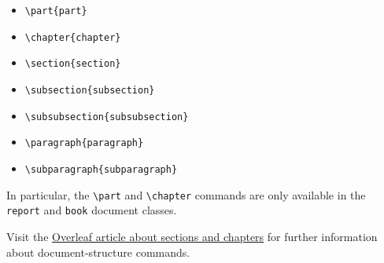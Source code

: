 \begin{itemize}
    \item \verb|\part{part}|
    \item \verb|\chapter{chapter}|
    \item \verb|\section{section}|
    \item \verb|\subsection{subsection}|
    \item \verb|\subsubsection{subsubsection}|
    \item \verb|\paragraph{paragraph}|
    \item \verb|\subparagraph{subparagraph}|
\end{itemize}

In particular, the \verb|\part| and \verb|\chapter| commands are only available in the \verb|report| and \verb|book| document classes.

Visit the \href{https://www.overleaf.com/learn/latex/Sections_and_chapters}{Overleaf article about sections and chapters} for further information about document-structure commands.